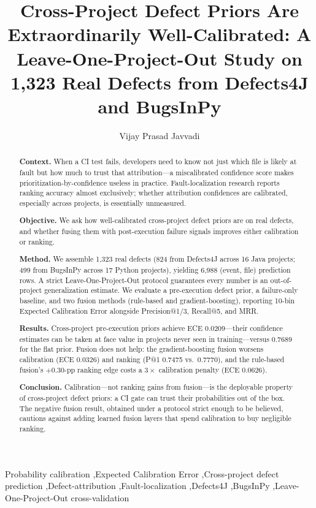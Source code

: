 \documentclass[preprint,12pt]{elsarticle}
\begin{document}
\begin{frontmatter}

\title{Cross-Project Defect Priors Are Extraordinarily Well-Calibrated: A Leave-One-Project-Out Study on 1{,}323 Real Defects from Defects4J and BugsInPy}

\author[1]{Vijay Prasad Javvadi}

\begin{abstract}
\noindent\textbf{Context.} When a CI test fails, developers need to know not just which file is likely at fault but how much to trust that attribution---a miscalibrated confidence score makes prioritization-by-confidence useless in practice. Fault-localization research reports ranking accuracy almost exclusively; whether attribution confidences are calibrated, especially across projects, is essentially unmeasured.

\noindent\textbf{Objective.} We ask how well-calibrated cross-project defect priors are on real defects, and whether fusing them with post-execution failure signals improves either calibration or ranking.

\noindent\textbf{Method.} We assemble 1{,}323 real defects (824 from Defects4J across 16 Java projects; 499 from BugsInPy across 17 Python projects), yielding 6{,}988 (event, file) prediction rows. A strict Leave-One-Project-Out protocol guarantees every number is an out-of-project generalization estimate. We evaluate a pre-execution defect prior, a failure-only baseline, and two fusion methods (rule-based and gradient-boosting), reporting 10-bin Expected Calibration Error alongside Precision@1/3, Recall@5, and MRR.

\noindent\textbf{Results.} Cross-project pre-execution priors achieve ECE 0.0209---their confidence estimates can be taken at face value in projects never seen in training---versus 0.7689 for the flat prior. Fusion does not help: the gradient-boosting fusion worsens calibration (ECE 0.0326) and ranking (P@1 0.7475 vs.\ 0.7770), and the rule-based fusion's $+0.30$-pp ranking edge costs a $3\times$ calibration penalty (ECE 0.0626).

\noindent\textbf{Conclusion.} Calibration---not ranking gains from fusion---is the deployable property of cross-project defect priors: a CI gate can trust their probabilities out of the box. The negative fusion result, obtained under a protocol strict enough to be believed, cautions against adding learned fusion layers that spend calibration to buy negligible ranking.
\end{abstract}

\begin{keyword}
Probability calibration \sep Expected Calibration Error \sep Cross-project defect prediction \sep Defect-attribution \sep Fault-localization \sep Defects4J \sep BugsInPy \sep Leave-One-Project-Out cross-validation
\end{keyword}

\end{frontmatter}
\end{document}
